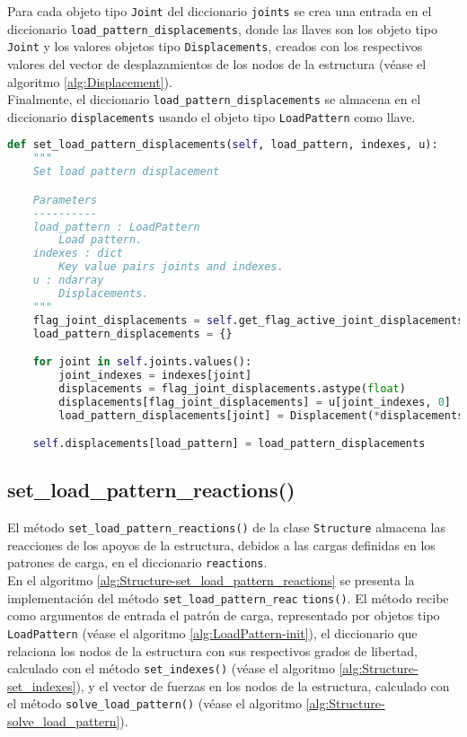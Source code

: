 Para cada objeto tipo \verb|Joint| del diccionario \verb|joints| se crea una entrada en el diccionario \verb|load_pattern_displacements|, donde las llaves son los objeto tipo \verb|Joint| y los valores objetos tipo \verb|Displacements|, creados con los respectivos valores del vector de desplazamientos de los nodos de la estructura (véase el algoritmo \ref{alg:Displacement}).\\

Finalmente, el diccionario \verb|load_pattern_displacements| se almacena en el diccionario \verb|displacements| usando el objeto tipo \verb|LoadPattern| como llave.\\

\begin{lstlisting}[language=Python,caption=Método \texttt{set\_load\_pattern\_displacements()} de la clase \texttt{Structure}.,label=alg:Structure-set_load_pattern_displacements, frame=single]
def set_load_pattern_displacements(self, load_pattern, indexes, u):
    """
    Set load pattern displacement

    Parameters
    ----------
    load_pattern : LoadPattern
        Load pattern.
    indexes : dict
        Key value pairs joints and indexes.
    u : ndarray
        Displacements.
    """
    flag_joint_displacements = self.get_flag_active_joint_displacements()
    load_pattern_displacements = {}

    for joint in self.joints.values():
        joint_indexes = indexes[joint]
        displacements = flag_joint_displacements.astype(float)
        displacements[flag_joint_displacements] = u[joint_indexes, 0]
        load_pattern_displacements[joint] = Displacement(*displacements)

    self.displacements[load_pattern] = load_pattern_displacements
\end{lstlisting}

\subsection{set\_load\_pattern\_reactions()}

El método \verb|set_load_pattern_reactions()| de la clase \verb|Structure| almacena las reacciones de los apoyos de la estructura, debidos a las cargas definidas en los patrones de carga, en el diccionario \verb|reactions|.\\

En el algoritmo \ref{alg:Structure-set_load_pattern_reactions} se presenta la implementación del método \verb|set_load_pattern_reac| \verb|tions()|. El método recibe como argumentos de entrada el patrón de carga, representado por objetos tipo \verb|LoadPattern| (véase el algoritmo \ref{alg:LoadPattern-init}), el diccionario que relaciona los nodos de la estructura con sus respectivos grados de libertad, calculado con el método \verb|set_indexes()| (véase el algoritmo \ref{alg:Structure-set_indexes}), y el vector de fuerzas en los nodos de la estructura, calculado con el método \verb|solve_load_pattern()| (véase el algoritmo \ref{alg:Structure-solve_load_pattern}).\\

